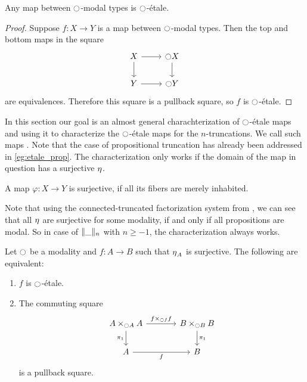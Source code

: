 \documentclass[9pt,twosided]{amsart}
\begin{document}
\begin{lem}\label{lem:etale_modal}
Any map between ${\ocircle}$-modal types is ${\ocircle}$-\'etale.
\end{lem}

\begin{proof}
Suppose $f:X\to Y$ is a map between ${\ocircle}$-modal types. Then the top and bottom maps in the square
\begin{equation*}
\begin{tikzcd}
X \arrow[r] \arrow[d] & \modal X \arrow[d] \\
Y \arrow[r] & \modal Y
\end{tikzcd}
\end{equation*}
are equivalences. Therefore this square is a pullback square, so $f$ is ${\ocircle}$-\'etale.
\end{proof}

In this section our goal is an almost general charachterization of ${\ocircle}$-étale maps and using it to characterize the ${\ocircle}$-\'etale maps for the $n$-truncations. We call such maps . Note that the case of propositional truncation has already been addressed in \cref{eg:etale_prop}.
The characterization only works if the domain of the map in question has a surjective ${\eta_{}}$.
\begin{defn}
  A map $\varphi:X\to Y$ is surjective, if all its fibers are merely inhabited.
\end{defn}
Note that using the connected-truncated factorization system from \cite{RijkeSpittersShulman}, we can see that all ${\eta_{}}$ are surjective for some modality, if and only if all propositions are modal.
So in case of $\trunc{n}{\_}$ with $n\geq -1$, the characterization always works.

\begin{lem}\label{lem:etale_char}
Let ${\ocircle}$ be a modality and $f:A\to B$ such that ${\eta_{}}_A$ is surjective. The following are equivalent:
\begin{enumerate}
\item $f$ is ${\ocircle}$-\'etale.
\item The commuting square
\begin{equation*}
\begin{tikzcd}[column sep=large]
A\times_{\modal A} A \arrow[d,swap,"\pi_1"] \arrow[r,"{f\times_{\modal f} f}"] & B\times_{\modal B} B \arrow[d,"\pi_1"] \\
A \arrow[r,swap,"f"] & B
\end{tikzcd}
\end{equation*}
is a pullback square.
\end{enumerate}
\end{lem}
\end{document}
